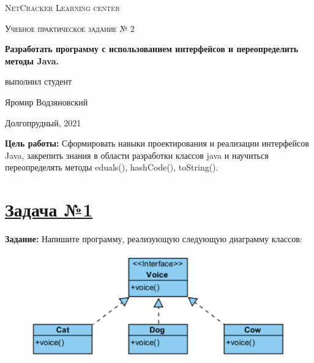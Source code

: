\documentclass[a4paper]{article}
\begin{document}
\graphicspath{ {pictures/} }

\begin{titlepage}
	\centering
	\vspace{5cm}
    {\scshape\LARGE NetCracker Learning center\par}
	\vspace{5cm}
	{\scshape\Large  Учебное практическое задание № 2 \par}
	\vspace{1cm}
    {\huge\bfseries  Разработать программу с использованием интерфейсов и переопределить методы Java. \par}
	\vspace{1cm}
	\vfill
    \begin{flushright}
        {\large выполнил студент}\par
        \vspace{0.3cm}
        {\LARGE Яромир Водзяновский}
    \end{flushright}
	\vfill
Долгопрудный, 2021
\end{titlepage}

\pagestyle{fancy} 
\fancyfoot[C]{ \noindent\rule{\textwidth}{0.4pt} \thepage }



\newpage 


\textbf{Цель работы: }
Сформировать навыки проектирования и реализации интерфейсов Java, закрепить знания в области разработки классов java и научиться переопределять методы eduals(), hashCode(), toString().

\section{\href{https://github.com/yarvod/NetCracker_LearningCenter/tree/main/Practise_tasks/Practice_task_1}{Задача №1}}

\textbf{Задание:} Напишите программу, реализующую следующую диаграмму классов: \par

\begin{figure}[H]
    \begin{center}
        \includegraphics[scale = 0.5]{task1.png}
    \end{center}
\end{figure}
\end{document}
